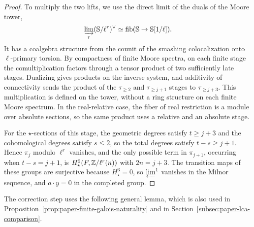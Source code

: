 \begin{proof}
To multiply the two lifts, we use the direct limit of the duals of the Moore tower,
\[
 \varinjlim_r (\mathbb S/\ell^r)^\vee
        \simeq\operatorname{fib}(\mathbb S\to\mathbb S[1/\ell]).
\]
It has a coalgebra structure from the counit of the smashing colocalization onto $\ell$-primary torsion.
By compactness of finite Moore spectra, on each finite stage the comultiplication factors through a tensor product of two sufficiently late stages.
Dualizing gives products on the inverse system, and additivity of connectivity sends the product of the $\tau_{\ge2}$ and $\tau_{\ge j+1}$ stages to $\tau_{\ge j+3}$.
This multiplication is defined on the tower, without a ring structure on each finite Moore spectrum.
In the real-relative case, the fiber of real restriction is a module over absolute sections, so the same product uses a relative and an absolute stage.

For the $\star$-sections of this stage, the geometric degrees satisfy $t\ge j+3$ and the cohomological degrees satisfy $s\le2$, so the total degrees satisfy $t-s\ge j+1$.
Hence $\pi_j$ modulo $\ell^r$ vanishes, and the only possible term in $\pi_{j+1}$, occurring when $t-s=j+1$, is $H^2_\star(F,\mathbb Z/\ell^r(n))$ with $2n=j+3$.
The transition maps of these groups are surjective because $H^3_\star=0$, so $\varprojlim^1$ vanishes in the Milnor sequence, and $a\cdot y=0$ in the completed group.
\end{proof}

The correction step uses the following general lemma, which is also used in Proposition~\ref{prop:paper-finite-galois-naturality} and in Section~\ref{subsec:paper-lca-comparison}.

